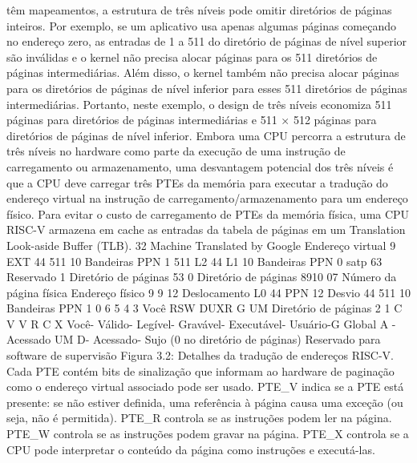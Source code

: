 têm  mapeamentos,  a  estrutura  de  três  níveis  pode  omitir  diretórios  de  páginas  inteiros.  Por  exemplo,  se  um  aplicativo  usa  
apenas  algumas  páginas  começando  no  endereço  zero,  as  entradas  de  1  a  511  do  diretório  de  páginas  de  nível  superior  são  
inválidas  e  o  kernel  não  precisa  alocar  páginas  para  os  511  diretórios  de  páginas  intermediárias.  Além  disso,  o  kernel  também  
não  precisa  alocar  páginas  para  os  diretórios  de  páginas  de  nível  inferior  para  esses  511  diretórios  de  páginas  intermediárias.  
Portanto,  neste  exemplo,  o  design  de  três  níveis  economiza  511  páginas  para  diretórios  de  páginas  intermediárias  e  511  ×  512  
páginas  para  diretórios  de  páginas  de  nível  inferior.
 Embora  uma  CPU  percorra  a  estrutura  de  três  níveis  no  hardware  como  parte  da  execução  de  uma  instrução  de  
carregamento  ou  armazenamento,  uma  desvantagem  potencial  dos  três  níveis  é  que  a  CPU  deve  carregar  três  PTEs  da  
memória  para  executar  a  tradução  do  endereço  virtual  na  instrução  de  carregamento/armazenamento  para  um  endereço  físico.
 Para  evitar  o  custo  de  carregamento  de  PTEs  da  memória  física,  uma  CPU  RISC-V  armazena  em  cache  as  entradas  da  tabela  
de  páginas  em  um  Translation  Look-aside  Buffer  (TLB).
 32
Machine Translated by Google
 Endereço  virtual
 9
 EXT
 44
 511
 10
 Bandeiras  PPN
 1
 511
 L2
 44
 L1
 10
 Bandeiras  PPN
 0
 satp
 63
 Reservado
 1
 Diretório  de  páginas
 53
 0
 Diretório  de  páginas
 8910  07
 Número  da  página  física
 Endereço  físico
 9
 9
 12
 Deslocamento  L0
 44
 PPN
 12
 Desvio
 44
 511
 10
 Bandeiras  PPN
 1
 0
 6  5  4  3  
Você
 RSW
 DUXR
 G
 UM
 Diretório  de  páginas
 2 1
 C
 V
 V
 R
 C
 X
 Você-  Válido-  Legível-  Gravável-  Executável-  Usuário-G  Global
 A  -  Acessado
 UM
 D-  Acessado-  Sujo  (0  no  diretório  de  páginas)
 Reservado  para  software  de  supervisão
 Figura  3.2:  Detalhes  da  tradução  de  endereços  RISC-V.
 Cada  PTE  contém  bits  de  sinalização  que  informam  ao  hardware  de  paginação  como  o  endereço  virtual  associado  
pode  ser  usado.  PTE_V  indica  se  a  PTE  está  presente:  se  não  estiver  definida,  uma  referência  à  página  causa  uma  
exceção  (ou  seja,  não  é  permitida).  PTE_R  controla  se  as  instruções  podem  ler  na  página.  PTE_W  controla  se  as  
instruções  podem  gravar  na  página.  PTE_X  controla  se  a  CPU  pode  interpretar  o  conteúdo  da  página  como  instruções  
e  executá-las.

